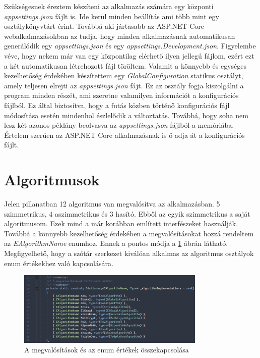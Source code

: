 \documentclass[12pt]{report} %
\begin{document}
Szükségesnek éreztem készíteni az alkalmazás számára egy központi \textit{appsettings.json} fájlt is. Ide kerül minden beállítás ami több mint egy osztálykönyvtárt érint. Továbbá aki jártasabb az ASP.NET Core webalkalmazásokban az tudja, hogy minden alkalmazásnak automatikusan generálódik egy \textit{appsettings.json} és egy \textit{appsettings.Development.json}. Figyelembe véve, hogy nekem már van egy központilag elérhető ilyen jellegú fájlom, ezért ezt a két automatikusan létrehozott fájl töröltem. Valamit a könnyebb és egységes kezelhetőség érdekében készítettem egy \textit{GlobalConfiguration} statikus osztályt, amely teljesen elrejti az \textit{appsettings.json} fájt. Ez az osztály fogja kiszolgálni a program minden részét, ami szeretne valamilyen információt a konfigurációs fájlból. Ez által biztosítva, hogy a futás közben történő konfigurációs fájl módosítása esetén mindenhol észlelődik a változtatás. Továbbá, hogy soha nem lesz két azonos példány beolvasva az \textit{appsettings.json} fájlból a memóriába. Értelem szerűen az ASP.NET Core alkalmazásnak is ő adja át a konfigurációs fájlt.

\section{Algoritmusok} %

Jelen pillanatban 12 algoritmus van megvalósítva az alkalmazásban. 5 szimmetrikus, 4 aszimmetrikus és 3 hasító. Ebből az egyik szimmetrikus a saját algoritmusom. Ezek mind a már korábban említett interfészeket használják. Továbbá a könnyebb kezelhetőség érdekében a megvalósításokat hozzá rendeltem az \textit{EAlgorithmName} enumhoz. Ennek a pontos módja a \ref{fig:Implementation2} ábrán látható. Megfigyelhető, hogy a szótár szerkezet kiválóan alkalmas az algoritmus osztályok enum értékekhez való kapcsolására.

\begin{figure}[H]
    \centering %
    \includegraphics[width=0.8\textwidth]{Figures/Implementation2.png} %
    \caption{A megvalósítások és az enum értékek összekapcsolása} %
    \label{fig:Implementation2} %
\end{figure}
\end{document}
